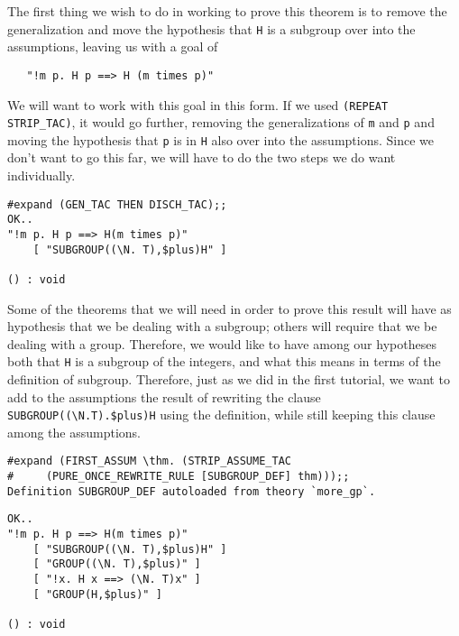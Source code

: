 The first thing we wish to do in working to prove this theorem is to
remove the generalization and move the hypothesis that {\small\tt H}
is a subgroup over into the assumptions, leaving us with a goal of
\begin{verbatim}
   "!m p. H p ==> H (m times p)"
\end{verbatim}
We will want to work with this goal in this form.  If we used
{\small\verb+(REPEAT STRIP_TAC)+}, it would go further, removing the
generalizations of {\small\tt m} and {\small\tt p} and moving the
hypothesis that {\small\tt p} is in {\small\tt H} also over into the
assumptions.  Since we don't want to go this far, we will have to do
the two steps we do want individually.
\begin{session}
\begin{verbatim}
#expand (GEN_TAC THEN DISCH_TAC);;
OK..
"!m p. H p ==> H(m times p)"
    [ "SUBGROUP((\N. T),$plus)H" ]

() : void
\end{verbatim}
\end{session}

Some of the theorems that we will need in order to prove this result
will have as hypothesis that we be dealing with a subgroup; others
will require that we be dealing with a group.  Therefore, we would
like to have among our hypotheses both that {\small\tt H} is a
subgroup of the integers, and what this means in terms of the
definition of subgroup.  Therefore, just as we did in the first
tutorial, we want to add to the assumptions the result of rewriting
the clause {\small\verb+SUBGROUP((\N.T).$plus)H+} using the
definition, while still keeping this clause among the assumptions.
\begin{session}
\begin{verbatim}
#expand (FIRST_ASSUM \thm. (STRIP_ASSUME_TAC
#     (PURE_ONCE_REWRITE_RULE [SUBGROUP_DEF] thm)));;
Definition SUBGROUP_DEF autoloaded from theory `more_gp`.
\end{verbatim}
\mvdots
\begin{verbatim}
OK..
"!m p. H p ==> H(m times p)"
    [ "SUBGROUP((\N. T),$plus)H" ]
    [ "GROUP((\N. T),$plus)" ]
    [ "!x. H x ==> (\N. T)x" ]
    [ "GROUP(H,$plus)" ]

() : void
\end{verbatim}
\end{session}

